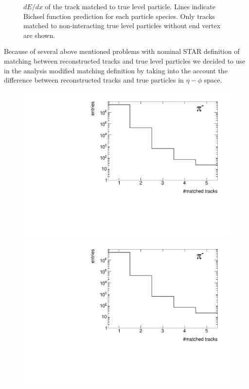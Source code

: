 \begin{figure}[ht]
{	}%
	\caption[$dE/dx$ of the track matched to true level particle.]{$dE/dx$ of the track matched to true level particle. Lines indicate Bichsel function prediction for each particle species. Only tracks matched to non-interacting true level particles without end vertex  are shown.}\label{fig:trackSplittingNominaldEdx}
\end{figure}

Because of several above mentioned  problems with  nominal STAR definition of matching between reconstructed tracks and true  level particles we decided to use in the analysis modified matching            
definition by taking into the account the difference    between reconstructed tracks and true particles in $\eta-\phi$ space.




\begin{figure}[hb]
	\centering
	\parbox{0.329\textwidth}{
		\centering
		\includegraphics[width=\linewidth,page=25]{graphics/eff/trackSplitting_CD.pdf}\\
		\includegraphics[width=\linewidth,page=28]{graphics/eff/trackSplitting_CD.pdf}\\
}
\end{figure}
